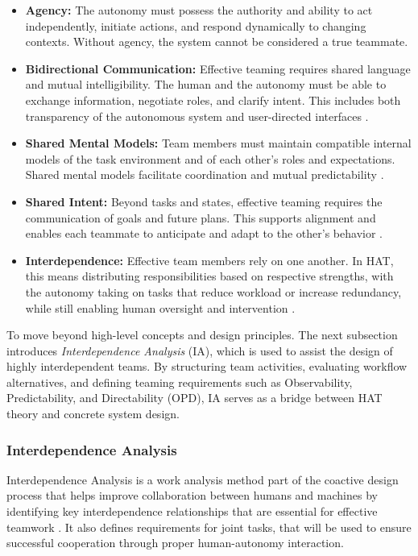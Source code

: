 \documentclass[12pt,a4paper]{article} %
\begin{document}
	\begin{itemize}
		\item \textbf{Agency:} The autonomy must possess the authority and ability to act independently, initiate actions, and respond dynamically to changing contexts. Without agency, the system cannot be considered a true teammate.
		
		\item \textbf{Bidirectional Communication:} Effective teaming requires shared language and mutual intelligibility. The human and the autonomy must be able to exchange information, negotiate roles, and clarify intent. This includes both transparency of the autonomous system and user-directed interfaces \parencite{christoffersen_1_2002,liu_cognitive_2016}.
		
		\item \textbf{Shared Mental Models:} Team members must maintain compatible internal models of the task environment and of each other's roles and expectations. Shared mental models facilitate coordination and mutual predictability \parencite{cooke_interactive_2013,liu_cognitive_2016}.
		
		\item \textbf{Shared Intent:} Beyond tasks and states, effective teaming requires the communication of goals and future plans. This supports alignment and enables each teammate to anticipate and adapt to the other's behavior \parencite{lyons_humanautonomy_2021,endsley_ironies_2023}.
		
		\item \textbf{Interdependence:} Effective team members rely on one another. In HAT, this means distributing responsibilities based on respective strengths, with the autonomy taking on tasks that reduce workload or increase redundancy, while still enabling human oversight and intervention \parencite{lawless_editorial_2023,johnson_no_2019}.
	\end{itemize}

	To move beyond high-level concepts and design principles. The next subsection introduces \textit{Interdependence Analysis} (IA), which is used to assist the design of highly interdependent teams. By structuring team activities, evaluating workflow alternatives, and defining teaming requirements such as Observability, Predictability, and Directability (OPD), IA serves as a bridge between HAT theory and concrete system design. 

	\subsubsection{Interdependence Analysis}
	Interdependence Analysis is a work analysis method part of the coactive design process that helps improve collaboration between humans and machines by identifying key interdependence relationships that are essential for effective teamwork \parencite{johnson_coactive_2014}. It also defines requirements for joint tasks, that will be used to ensure successful cooperation through proper human-autonomy interaction. 
	
\end{document}
